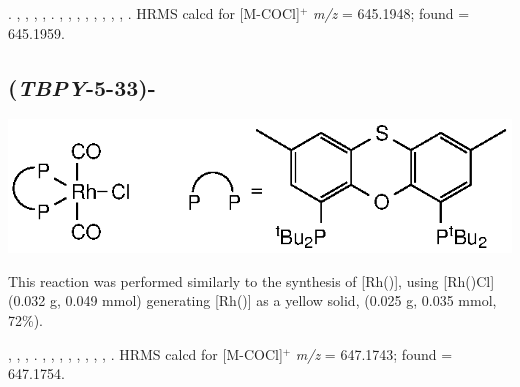 .
,
,
,
,
.
,
,
,
,
,
,
,
,
.
HRMS calcd for  [M-COCl]$^+$ \emph{m/z} = 645.1948; found = 645.1959.



\subsection*{(\emph{TBPY}-5-33)-}

\begin{structure}[h]
\begin{center}
\includegraphics{../Structures/RhCl(StBu)(CO)2.eps}
\end{center}
\end{structure}

This reaction was performed similarly to the synthesis of [Rh(\tBusixantphos)], using [Rh(\tButhixantphos)Cl] (0.032 g, 0.049 mmol) generating [Rh(\tButhixantphos)] as a yellow solid, (0.025 g, 0.035 mmol, 72\%).  

,
,
,
.
,
,
,
,
,
,
,
,
.
HRMS calcd for  [M-COCl]$^+$ \emph{m/z} = 647.1743; found = 647.1754.


